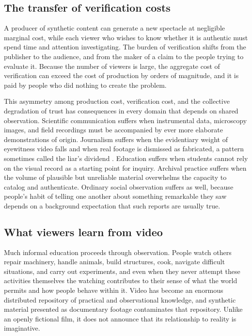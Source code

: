 \documentclass[12pt]{article}
\theoremstyle{plain}
\theoremstyle{definition}
\theoremstyle{remark}
\begin{document}
\subsection{The transfer of verification costs}

A producer of synthetic content can generate a new spectacle at negligible marginal cost, while each viewer who wishes to know whether it is authentic must spend time and attention investigating. The burden of verification shifts from the publisher to the audience, and from the maker of a claim to the people trying to evaluate it. Because the number of viewers is large, the aggregate cost of verification can exceed the cost of production by orders of magnitude, and it is paid by people who did nothing to create the problem.

This asymmetry among production cost, verification cost, and the collective degradation of trust has consequences in every domain that depends on shared observation. Scientific communication suffers when instrumental data, microscopy images, and field recordings must be accompanied by ever more elaborate demonstrations of origin. Journalism suffers when the evidentiary weight of eyewitness video falls and when real footage is dismissed as fabricated, a pattern sometimes called the liar's dividend \cite{chesney2019}. Education suffers when students cannot rely on the visual record as a starting point for inquiry. Archival practice suffers when the volume of plausible but unreliable material overwhelms the capacity to catalog and authenticate. Ordinary social observation suffers as well, because people's habit of telling one another about something remarkable they saw depends on a background expectation that such reports are usually true.

\subsection{What viewers learn from video}

Much informal education proceeds through observation. People watch others repair machinery, handle animals, build structures, cook, navigate difficult situations, and carry out experiments, and even when they never attempt these activities themselves the watching contributes to their sense of what the world permits and how people behave within it. Video has become an enormous distributed repository of practical and observational knowledge, and synthetic material presented as documentary footage contaminates that repository. Unlike an openly fictional film, it does not announce that its relationship to reality is imaginative.
\end{document}
